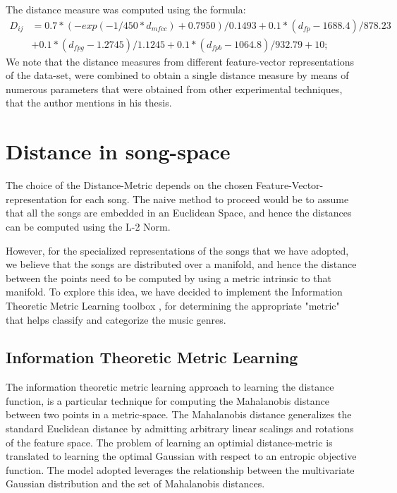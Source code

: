 \documentclass[10pt]{article}
\begin{document}
The distance measure was computed using the formula:
\begin{align*}
D_{ij} &= 0.7*(-exp(-1/450*d_{mfcc})+0.7950)/0.1493 + 0.1*(d_{fp}-1688.4)/878.23 \\
&+ 0.1*(d_{fpg}-1.2745)/1.1245 + 0.1*(d_{fpb}-1064.8)/932.79 + 10; 
\end{align*}
We note that the distance measures from different feature-vector representations of the data-set, were combined to obtain a single distance measure by means of numerous parameters that were obtained from other experimental techniques, that the author mentions in his thesis. 
    


\section{Distance in song-space}

The choice of the Distance-Metric depends on the chosen Feature-Vector-representation for each song. The naive method to proceed would be to assume that all the songs are embedded in an Euclidean Space, and hence the distances can be computed using the L-2 Norm. 

However, for the specialized representations of the songs that we have adopted, we believe that the songs are distributed over a manifold, and hence the distance between the points need to be computed by using a metric intrinsic to that manifold. To explore this idea, we have decided to implement the Information Theoretic Metric Learning toolbox \cite{infoTheoryMetricLearning}, for determining the appropriate "metric" that helps classify and categorize the music genres. 

\subsection{Information Theoretic Metric Learning}

The information theoretic metric learning \cite{infoTheoryMetricLearning} approach to learning the distance function, is a particular technique for computing the Mahalanobis distance between two points in a metric-space. The Mahalanobis distance generalizes the standard Euclidean distance by admitting arbitrary linear scalings and rotations of the feature space. The problem of learning an optimial distance-metric is translated to learning the optimal Gaussian with respect to an entropic objective function. The model adopted leverages the relationship between the multivariate Gaussian distribution and the set of Mahalanobis distances. 
\end{document}
